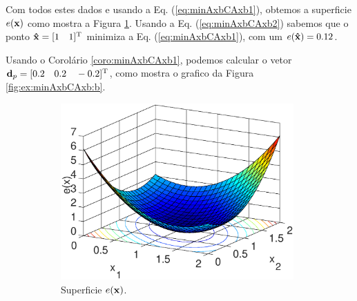 \begin{SolutionT}
\label{ex:minAxbCAxb:sol1}
Com todos estes dados e usando a Eq. (\ref{eq:minAxbCAxb1}),
obtemos a superficie $e(\VECTOR{x})$ como mostra a Figura \ref{fig:ex:minAxbCAxb:a}.
Usando a Eq. (\ref{eq:minAxbCAxb2}) sabemos que o ponto $\VECTOR{\hat{x}}=[1\quad 1]^{\transpose}$
minimiza a Eq. (\ref{eq:minAxbCAxb1}), com um $e(\VECTOR{\hat{x}})=0.12$.

Usando o Corolário \ref{coro:minAxbCAxb1}, podemos calcular o vetor $\VECTOR{d}_p=[0.2 \quad 0.2 \quad -0.2]^{\transpose}$,
como mostra o grafico da Figura \ref{fig:ex:minAxbCAxb:b}.

\begin{figure}[h!]
     \centering
     \begin{subfigure}[b]{0.66\textwidth}
         \centering
         \includegraphics[width=0.98\textwidth]{chapters/minimization-fx/mfiles/ax1/surfcex.eps}
         \caption{Superficie $e(\VECTOR{x})$. }
         \label{fig:ex:minAxbCAxb:a}
     \end{subfigure}
     \hfill
     \begin{subfigure}[b]{0.32\textwidth}
         \centering

\end{subfigure}
\end{figure}
\end{SolutionT}
